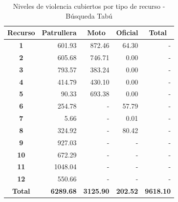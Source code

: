 \begin{table}
\centering
\caption{Niveles de violencia cubiertos por tipo de recurso - Búsqueda Tabú}
\label{table:resultados-tabu}
\begin{tabular}{crrrr}
\toprule
\textbf{Recurso} & \multicolumn{1}{c}{\textbf{Patrullera}} & \multicolumn{1}{c}{\textbf{Moto}} & \multicolumn{1}{c}{\textbf{Oficial}} & \multicolumn{1}{c}{\textbf{Total}} \\ \hline
\textbf{1}       & 601.93                                  & 872.46                            & 64.30                                & -                                  \\
\textbf{2}       & 605.68                                  & 746.71                            & 0.00                                 & -                                  \\
\textbf{3}       & 793.57                                  & 383.24                            & 0.00                                 & -                                  \\
\textbf{4}       & 414.79                                  & 430.10                            & 0.00                                 & -                                  \\
\textbf{5}       & 90.33                                   & 693.38                            & 0.00                                 & -                                  \\
\textbf{6}       & 254.78                                  & -                                 & 57.79                                & -                                  \\
\textbf{7}       & 5.66                                    & -                                 & 0.01                                 & -                                  \\
\textbf{8}       & 324.92                                  & -                                 & 80.42                                & -                                  \\
\textbf{9}       & 927.03                                  & -                                 & -                                    & -                                  \\
\textbf{10}      & 672.29                                  & -                                 & -                                    & -                                  \\
\textbf{11}      & 1048.04                                 & -                                 & -                                    & -                                  \\
\textbf{12}      & 550.66                                  & -                                 & -                                    & -                                  \\ \hline
\textbf{Total}   & \textbf{6289.68}                        & \textbf{3125.90}                  & \textbf{202.52}                      & \textbf{9618.10}                   \\
\bottomrule
\end{tabular}
\end{table}
